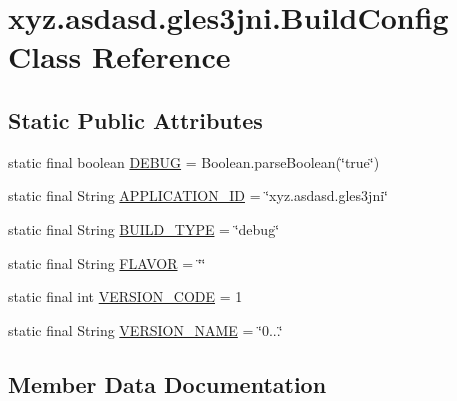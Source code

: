 \hypertarget{classxyz_1_1asdasd_1_1gles3jni_1_1_build_config}{}\section{xyz.\+asdasd.\+gles3jni.\+Build\+Config Class Reference}
\label{classxyz_1_1asdasd_1_1gles3jni_1_1_build_config}
\subsection*{Static Public Attributes}
\begin{DoxyCompactItemize}
\item 
static final boolean \hyperlink{classxyz_1_1asdasd_1_1gles3jni_1_1_build_config_a3c687337c2bcd4ceb79473f77725976b}{D\+E\+B\+UG} = Boolean.\+parse\+Boolean(\char`\"{}true\char`\"{})
\item 
static final String \hyperlink{classxyz_1_1asdasd_1_1gles3jni_1_1_build_config_af859dac95966f531b8eabbc685d838ac}{A\+P\+P\+L\+I\+C\+A\+T\+I\+O\+N\+\_\+\+ID} = \char`\"{}xyz.\+asdasd.\+gles3jni\char`\"{}
\item 
static final String \hyperlink{classxyz_1_1asdasd_1_1gles3jni_1_1_build_config_a4b02127eb82d8dfbefc5ef67033b694e}{B\+U\+I\+L\+D\+\_\+\+T\+Y\+PE} = \char`\"{}debug\char`\"{}
\item 
static final String \hyperlink{classxyz_1_1asdasd_1_1gles3jni_1_1_build_config_af9b5a6915c6c7957643e1ae19834164d}{F\+L\+A\+V\+OR} = \char`\"{}\char`\"{}
\item 
static final int \hyperlink{classxyz_1_1asdasd_1_1gles3jni_1_1_build_config_a4c044057118708bcb7b27a460526a292}{V\+E\+R\+S\+I\+O\+N\+\_\+\+C\+O\+DE} = 1
\item 
static final String \hyperlink{classxyz_1_1asdasd_1_1gles3jni_1_1_build_config_a25c76741b4552048d334c8b642c54b8e}{V\+E\+R\+S\+I\+O\+N\+\_\+\+N\+A\+ME} = \char`\"{}0...\char`\"{}
\end{DoxyCompactItemize}


\subsection{Member Data Documentation}
\mbox{\label{classxyz_1_1asdasd_1_1gles3jni_1_1_build_config_af859dac95966f531b8eabbc685d838ac}} 
